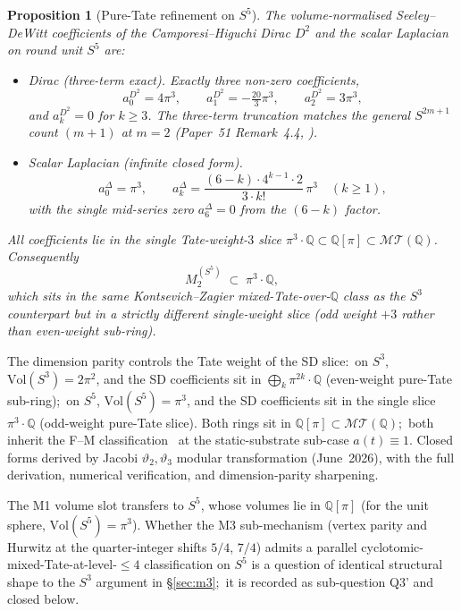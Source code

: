 \documentclass[11pt,a4paper]{article}
\theoremstyle{plain}
\newtheorem{proposition}[theorem]{Proposition}
\theoremstyle{definition}
\newcommand{\sthree}{S^{3}}
\newcommand{\sfive}{S^{5}}
\newcommand{\Q}{\mathbb{Q}}
\newcommand{\Vol}{\mathrm{Vol}}
\newcommand{\MT}{\mathcal{MT}}
\begin{document}
\begin{proposition}[Pure-Tate refinement on $\sfive$]
\label{prop:s5_pure_tate}
The volume-normalised Seeley--DeWitt coefficients of the
Camporesi--Higuchi Dirac $D^2$ and the scalar Laplacian on round
unit $\sfive$ are:
\begin{itemize}
  \item \textit{Dirac (three-term exact).}  Exactly three non-zero
    coefficients,
    \[
    a_0^{D^2} = 4\pi^3,\qquad
    a_1^{D^2} = -\tfrac{20}{3}\pi^3,\qquad
    a_2^{D^2} = 3\pi^3,
    \]
    and $a_k^{D^2} = 0$ for $k \ge 3$.  The three-term truncation
    matches the general $S^{2m+1}$ count $(m{+}1)$ at $m = 2$
    (Paper~51 Remark~4.4,
    \cite{loutey_paper51}).
  \item \textit{Scalar Laplacian (infinite closed form).}
    \[
    a_0^\Delta = \pi^3,\qquad
    a_k^\Delta = \frac{(6 - k)\cdot 4^{k-1}\cdot 2}{3\cdot k!}\,\pi^3
    \quad (k \ge 1),
    \]
    with the single mid-series zero $a_6^\Delta = 0$ from the
    $(6 - k)$ factor.
\end{itemize}
All coefficients lie in the single Tate-weight-$3$ slice
$\pi^3\cdot\Q \subset \Q[\pi] \subset \MT(\Q)$.  Consequently
\begin{equation}
\label{eq:m2_s5_ring}
M_2^{(\sfive)} \;\subset\; \pi^3\cdot\Q,
\end{equation}
which sits in the same Kontsevich--Zagier mixed-Tate-over-$\Q$ class
as the $\sthree$ counterpart but in a strictly different single-weight
slice (odd weight $+3$ rather than even-weight sub-ring).
\end{proposition}

The dimension parity controls the Tate weight of the SD slice:\ on $\sthree$,
$\Vol(\sthree) = 2\pi^2$, and the SD coefficients sit in
$\bigoplus_k \pi^{2k}\cdot\Q$ (even-weight pure-Tate sub-ring);\ on $\sfive$,
$\Vol(\sfive) = \pi^3$, and the SD coefficients sit in the
single slice $\pi^3\cdot\Q$ (odd-weight pure-Tate slice).  Both rings sit
in $\Q[\pi] \subset \MT(\Q)$;\ both inherit the F--M
classification~\cite{fathizadeh_marcolli2016} at the static-substrate
sub-case $a(t) \equiv 1$.  Closed forms derived by Jacobi $\vartheta_2,
\vartheta_3$ modular transformation (June~2026), with the full derivation,
numerical verification, and
dimension-parity sharpening.

The M1 volume slot transfers to $\sfive$, whose volumes lie in
$\Q[\pi]$ (for the unit sphere, $\Vol(\sfive) = \pi^3$).  Whether the M3
sub-mechanism (vertex parity and Hurwitz at the quarter-integer shifts
$5/4$, $7/4$) admits a parallel cyclotomic-mixed-Tate-at-level-$\le 4$
classification on $\sfive$ is a question of identical structural shape
to the $\sthree$ argument in \S\ref{sec:m3};\ it is recorded as
sub-question Q3' and closed below.
\end{document}
